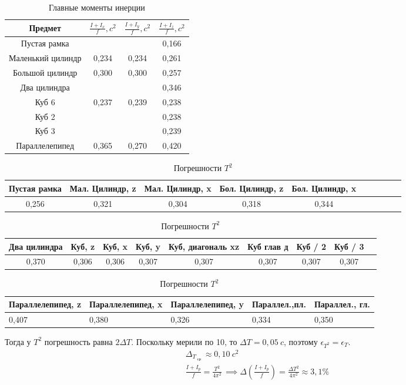  \begin{table}[!ht]
   \caption{Главные моменты инерции}
   \centering
   \begin{tabular}{|c|c|c|c|}
   \hline
       Предмет & $ \frac{I + I_x}{f}, c^2 $ & $ \frac{I + I_y}{f}, c^2 $ & $ \frac{I + I_z}{f}, c^2 $ \\ \hline
       Пустая рамка & ~ & ~ &  0,166  \\ \hline
       Маленький цилиндр &  0,234  &  0,234  &  0,261  \\ \hline
       Большой цилиндр &  0,300  &  0,300  &  0,257  \\ \hline
       Два цилиндра & ~ & ~ &  0,346  \\ \hline
       Куб 6 &  0,237  &  0,239  &  0,238  \\ \hline
       Куб 2 & ~ & ~ &  0,238  \\ \hline
       Куб 3 & ~ & ~ &  0,239  \\ \hline
       Параллелепипед &  0,365  &  0,270  &  0,420 \\ \hline
   \end{tabular}
\end{table}
\newpage
\begin{table}[!ht]
   \centering
   \caption{Погрешности $T^2$}
   \begin{tabular}{|c|c|c|c|c|c|c|c|c|c|}
   \hline
       Пустая рамка & Мал. Цилиндр,  z & Мал. Цилиндр,  x & Бол. Цилиндр, z & Бол. Цилиндр, x \\ \hline
       0,256 & 0,321 & 0,304 & 0,318 & 0,344 \\ \hline
   \end{tabular}
\end{table}
\begin{table}[!ht]
   \centering
   \caption{Погрешности $T^2$}
   \begin{tabular}{|c|c|c|c|c|c|c|c|c|}
   \hline
       Два цилиндра & Куб, z & Куб, x & Куб, y & Куб, диагональ xz & Куб глав д & Куб / 2 & Куб / 3\\ \hline
       0,370 & 0,306 & 0,306 & 0,307 & 0,307 & 0,307 & 0,307 & 0,307  \\ \hline
   \end{tabular}
\end{table}
\begin{table}[!ht]
   \centering
   \caption{Погрешности $T^2$}
   \begin{tabular}{|l|l|l|l|l|}
   \hline
       Параллелепипед, z & Параллелепипед, x & Параллелепипед, y & Параллел.,пл. & Параллел., гл. \\ \hline
       0,407 & 0,380 & 0,326 & 0,334 & 0,350 \\ \hline
   \end{tabular}
\end{table}
Тогда у $ T^2 $ погрешность равна $ 2\Delta T$. Поскольку мерили по 10, то $ \Delta T = 0,05~c $, поэтому $ \epsilon_{T^2} = \epsilon_T $. \begin{gather}
   \Delta_{T_\text{ ср }} \approx 0,10~c^2 \\
   \frac{I + I_p}{f} = \frac{T^2}{4\pi^2}\, \implies \Delta\left(\frac{I + I_p}{f}\right) = \frac{\Delta T^2}{4\pi^2} \approx 3,1\%
\end{gather}
 


